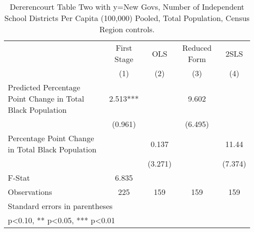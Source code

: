\begin{table}[htbp]\centering
\def\sym#1{\ifmmode^{#1}\else\(^{#1}\)\fi}
\caption{Dererencourt Table Two with y=New Govs, Number of Independent School Districts Per Capita (100,000) Pooled, Total Population, Census Region controls.}
\begin{tabular}{l*{4}{c}}
\toprule
                    & First Stage   &         OLS   &Reduced Form   &        2SLS   \\
                    &\multicolumn{1}{c}{(1)}   &\multicolumn{1}{c}{(2)}   &\multicolumn{1}{c}{(3)}   &\multicolumn{1}{c}{(4)}   \\
\midrule
Predicted Percentage Point Change in Total Black Population&       2.513***&               &       9.602   &               \\
                    &     (0.961)   &               &     (6.495)   &               \\
\addlinespace
Percentage Point Change in Total Black Population&               &       0.137   &               &       11.44   \\
                    &               &     (3.271)   &               &     (7.374)   \\
\midrule
F-Stat              &       6.835   &               &               &               \\
Observations        &         225   &         159   &         159   &         159   \\
\bottomrule
\multicolumn{5}{l}{\footnotesize Standard errors in parentheses}\\
\multicolumn{5}{l}{\footnotesize * p<0.10, ** p<0.05, *** p<0.01}\\
\end{tabular}
\end{table}
